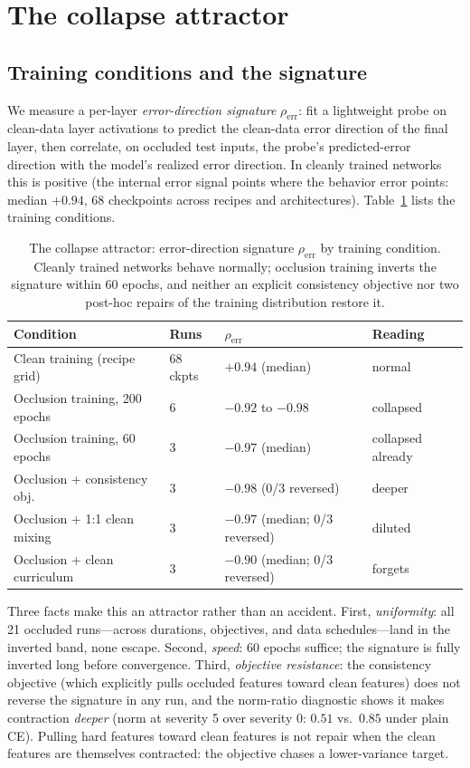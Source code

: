 \documentclass[10pt]{article}
\newcommand{\rhoerr}{\rho_{\mathrm{err}}}
\begin{document}
\section{The collapse attractor}
\label{sec:collapse}

\subsection{Training conditions and the signature}
\label{sec:threeway}

We measure a per-layer \emph{error-direction signature} $\rhoerr$: fit a
lightweight probe on clean-data layer activations to predict the
clean-data error direction of the final layer, then correlate, on
occluded test inputs, the probe's predicted-error direction with the
model's realized error direction. In cleanly trained networks this is
positive (the internal error signal points where the behavior error
points: median $+0.94$, 68 checkpoints across recipes and architectures).
Table~\ref{tab:attractor} lists the training conditions.

\begin{table}[h]
\centering
\small
\caption{The collapse attractor: error-direction signature $\rhoerr$ by
training condition. Cleanly trained networks behave normally; occlusion
training inverts the signature within 60 epochs, and neither an explicit
consistency objective nor two post-hoc repairs of the training
distribution restore it.}
\label{tab:attractor}
\begin{tabular}{llll}
\toprule
Condition & Runs & $\rhoerr$ & Reading \\
\midrule
Clean training (recipe grid) & 68 ckpts & $+0.94$ (median) & normal \\
Occlusion training, 200 epochs & 6 & $-0.92$ to $-0.98$ & collapsed \\
Occlusion training, 60 epochs & 3 & $-0.97$ (median) & collapsed already \\
Occlusion + consistency obj. & 3 & $-0.98$ (0/3 reversed) & deeper \\
Occlusion + 1:1 clean mixing & 3 & $-0.97$ (median; 0/3 reversed) & diluted \\
Occlusion + clean curriculum & 3 & $-0.90$ (median; 0/3 reversed) & forgets \\
\bottomrule
\end{tabular}
\end{table}

Three facts make this an attractor rather than an accident. First,
\emph{uniformity}: all 21 occluded runs---across durations, objectives,
and data schedules---land in the inverted band, none escape. Second, \emph{speed}: 60 epochs suffice; the signature is fully
inverted long before convergence. Third, \emph{objective resistance}: the
consistency objective (which explicitly pulls occluded features toward
clean features) does not reverse the signature in any run, and the
norm-ratio diagnostic shows it makes contraction \emph{deeper}
(norm at severity 5 over severity 0: $0.51$ vs.\ $0.85$ under plain CE).
Pulling hard features toward clean features is not repair when the clean
features are themselves contracted: the objective chases a lower-variance
target.
\end{document}
